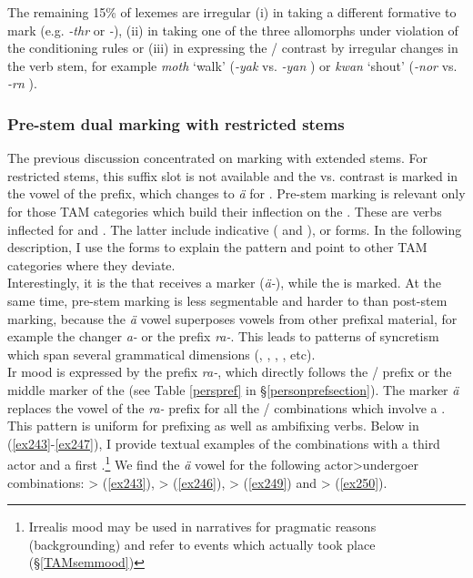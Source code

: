 The remaining 15\% of  lexemes are irregular (i) in taking a different formative to mark  (e.g. \emph{-thr} or \emph{-\Zero}), (ii) in taking one of the three allomorphs under violation of the conditioning rules or (iii) in expressing the / contrast by irregular changes in the verb stem, for example \emph{moth} `walk' (\emph{-yak} \Ndu{} vs. \emph{-yan} \Du) or \emph{kwan} `shout' (\emph{-nor} \Ndu{} vs. \emph{-rn} \Du).

\subsubsection{Pre-stem dual marking with restricted stems} \label{prerootdual}

The previous discussion concentrated on  marking with extended stems. For restricted stems, this suffix slot is not available and the  vs.  contrast is marked in the vowel of the prefix, which changes to \emph{ä} for . Pre-stem  marking is relevant only for those TAM categories which build their inflection on the . These are verbs inflected for  and  . The latter include indicative ( and  ),  or  forms. In the following description, I use the   forms to explain the pattern and point to other TAM categories where they deviate.\\

Interestingly, it is the  that receives a marker (\emph{ä-}), while the  is  marked. At the same time, pre-stem  marking is less segmentable and harder to  than post-stem  marking, because the  \emph{ä} vowel superposes vowels from other prefixal material, for example the  changer \emph{a-} or the  prefix \emph{ra-}. This leads to patterns of syncretism which span several grammatical dimensions (, , , , etc).\\

Ir mood is expressed by the prefix \emph{ra-}, which directly follows the / prefix or the middle marker of the \Bet{}  (see Table \ref{perspref} in \S{}\ref{personprefsection}). The  marker \emph{ä} replaces the vowel of the \emph{ra-} prefix for all the / combinations which involve a  . This pattern is uniform for prefixing as well as ambifixing verbs. Below in (\ref{ex243}-\ref{ex247}), I provide textual examples of the  combinations with a third  actor and a first  .\footnote{Irrealis mood may be used in narratives for pragmatic reasons (backgrounding) and refer to events which actually took place (\S{}\ref{TAMsemmood})} We find the \emph{ä} vowel for the following actor>undergoer combinations: \Sg>\Sg{} (\ref{ex243}), \Pl>\Sg{} (\ref{ex246}), \Sg>\Pl{} (\ref{ex249}) and \Pl>\Pl{} (\ref{ex250}).


